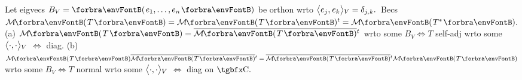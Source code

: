 



Let eigvecs $B_V=\Par{e_1,\dots,e_n}$ be orthon wrto $\big\langle{}e_j,\:\!e_k{}\big\rangle{_V}=\delta_{j,\:\!k}.$ \,Becs $\Mt{T}=\Mt{T}{^t}=\Mt{T^*}.$\PfEnd\vspace{2pt}
\ANote (a) $\Mt{T}=\overline{\Mt{T}}{^t}$ wrto some $B_V\Longleftrightarrow T$ self-adj wrto some $\big\langle{}\cdot,\cdot{}\big\rangle{_V}$ $\Longleftrightarrow$ diag.\parNot
(b) $\Mt{T}\overline{\Mt{T}}{^t}=\overline{\Mt{T}}{^t}\Mt{T}$ wrto some $B_V\Longleftrightarrow T$ normal wrto some $\big\langle{}\cdot,\cdot{}\big\rangle{_V}$ $\Longleftrightarrow$ diag on $\Cbb.$
\SepLine

